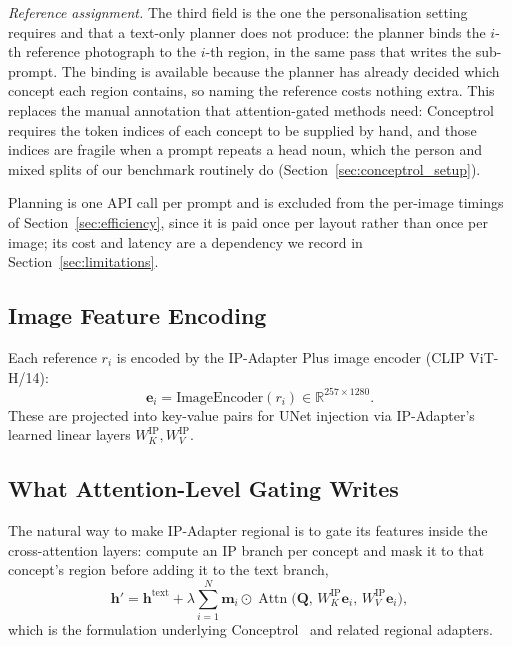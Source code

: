 \documentclass[10pt,twocolumn,letterpaper]{article}
\begin{document}
\noindent\textit{Reference assignment.}
The third field is the one the personalisation setting requires and that a
text-only planner does not produce: the planner binds the $i$-th reference
photograph to the $i$-th region, in the same pass that writes the sub-prompt.
The binding is available because the planner has already decided which
concept each region contains, so naming the reference costs nothing extra.
This replaces the manual annotation that attention-gated methods need:
Conceptrol~\cite{he2025conceptrol} requires the token indices of each
concept to be supplied by hand, and those indices are fragile when a prompt
repeats a head noun, which the person and mixed splits of our benchmark
routinely do (Section~\ref{sec:conceptrol_setup}).

Planning is one API call per prompt and is excluded from the per-image
timings of Section~\ref{sec:efficiency}, since it is paid once per layout rather
than once per image; its cost and latency are a dependency we record in
Section~\ref{sec:limitations}.

\subsection{Image Feature Encoding}
\label{sec:encoding}

Each reference $r_i$ is encoded by the IP-Adapter Plus image encoder
(CLIP ViT-H/14):
\begin{equation}
  \mathbf{e}_i = \mathrm{ImageEncoder}(r_i)\in\mathbb{R}^{257\times 1280}.
\end{equation}
These are projected into key-value pairs for UNet injection via
IP-Adapter's learned linear layers $W_K^{\mathrm{IP}},
W_V^{\mathrm{IP}}$.

\subsection{What Attention-Level Gating Writes}
\label{sec:why_gating_fails}

The natural way to make IP-Adapter regional is to gate its features
inside the cross-attention layers: compute an IP branch per concept and
mask it to that concept's region before adding it to the text branch,
\begin{equation}
  \mathbf{h}' = \mathbf{h}^{\mathrm{text}}
    + \lambda \sum_{i=1}^{N}\mathbf{m}_i \odot
      \operatorname{Attn}\!\bigl(\mathbf{Q},\,W_K^{\mathrm{IP}}\mathbf{e}_i,\,
      W_V^{\mathrm{IP}}\mathbf{e}_i\bigr),
  \label{eq:gated}
\end{equation}
which is the formulation underlying
Conceptrol~\cite{he2025conceptrol} and related regional adapters.
\end{document}
